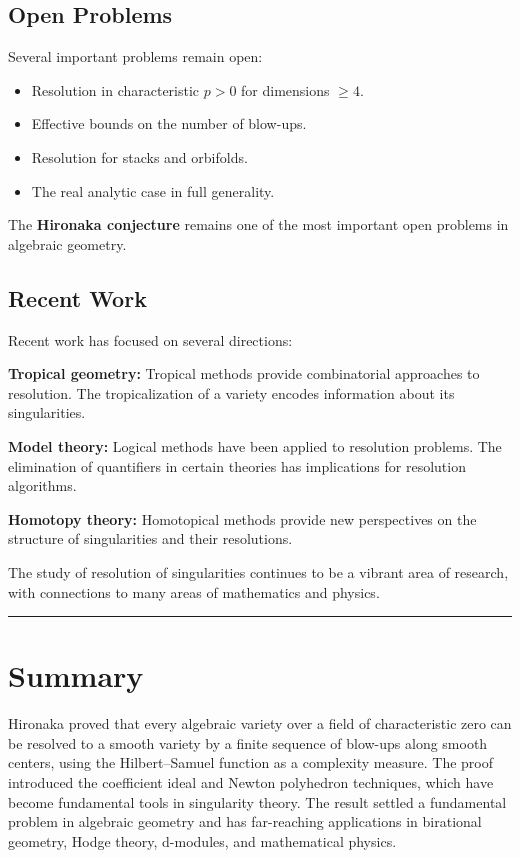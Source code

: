 \subsection*{Open Problems}

Several important problems remain open:

\begin{itemize}
\item Resolution in characteristic $p > 0$ for dimensions $\geq 4$.
\item Effective bounds on the number of blow-ups.
\item Resolution for stacks and orbifolds.
\item The real analytic case in full generality.
\end{itemize}

The \textbf{Hironaka conjecture} remains one of the most important open problems in algebraic geometry.

\subsection*{Recent Work}

Recent work has focused on several directions:

\textbf{Tropical geometry:} Tropical methods provide combinatorial approaches to resolution. The tropicalization of a variety encodes information about its singularities.

\textbf{Model theory:} Logical methods have been applied to resolution problems. The elimination of quantifiers in certain theories has implications for resolution algorithms.

\textbf{Homotopy theory:} Homotopical methods provide new perspectives on the structure of singularities and their resolutions.

The study of resolution of singularities continues to be a vibrant area of research, with connections to many areas of mathematics and physics.

\begin{center}\rule{0.5\linewidth}{0.5pt}\end{center}

\section*{Summary}

Hironaka proved that every algebraic variety over a field of characteristic zero can be resolved to a smooth variety by a finite sequence of blow-ups along smooth centers, using the Hilbert--Samuel function as a complexity measure. The proof introduced the coefficient ideal and Newton polyhedron techniques, which have become fundamental tools in singularity theory. The result settled a fundamental problem in algebraic geometry and has far-reaching applications in birational geometry, Hodge theory, d-modules, and mathematical physics.

